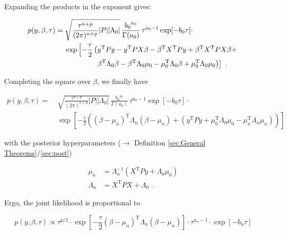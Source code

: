 \documentclass[a4paper,12pt,twoside]{book}
\begin{document}
Expanding the products in the exponent gives:

\begin{equation} \label{eq:blr-post-GLM-NG-JL-s3}
\begin{split}
p(y,\beta,\tau) = \; & \sqrt{\frac{\tau^{n+p}}{(2 \pi)^{n+p}} |P| |\Lambda_0|} \, \frac{ {b_0}^{a_0}}{\Gamma(a_0)} \, \tau^{a_0-1} \exp[-b_0 \tau] \cdot \\
& \exp\left[ -\frac{\tau}{2} \left( y^\mathrm{T} P y - y^\mathrm{T} P X \beta - \beta^\mathrm{T} X^\mathrm{T} P y + \beta^\mathrm{T} X^\mathrm{T} P X \beta + \right. \right. \\
& \hphantom{\exp \left[ -\frac{\tau}{2} \right.} \; \left. \left. \beta^\mathrm{T} \Lambda_0 \beta - \beta^\mathrm{T} \Lambda_0 \mu_0 - \mu_0^\mathrm{T} \Lambda_0 \beta + \mu_0^\mathrm{T} \Lambda_0 \mu_0 \right) \right] \; .
\end{split}
\end{equation}

Completing the square over $\beta$, we finally have

\begin{equation} \label{eq:blr-post-GLM-NG-JL-s4}
\begin{split}
p(y,\beta,\tau) = \; & \sqrt{\frac{\tau^{n+p}}{(2 \pi)^{n+p}} |P| |\Lambda_0|} \, \frac{ {b_0}^{a_0}}{\Gamma(a_0)} \, \tau^{a_0-1} \exp[-b_0 \tau] \cdot \\
& \exp\left[ -\frac{\tau}{2} \left( (\beta-\mu_n)^\mathrm{T} \Lambda_n (\beta-\mu_n) + (y^\mathrm{T} P y + \mu_0^\mathrm{T} \Lambda_0 \mu_0 - \mu_n^\mathrm{T} \Lambda_n \mu_n) \right) \right]
\end{split}
\end{equation}

with the posterior hyperparameters ($\rightarrow$ Definition \ref{sec:General Theorems}/\ref{sec:post})

\begin{equation} \label{eq:blr-post-GLM-NG-post-beta-par}
\begin{split}
\mu_n &= \Lambda_n^{-1} (X^\mathrm{T} P y + \Lambda_0 \mu_0) \\
\Lambda_n &= X^\mathrm{T} P X + \Lambda_0 \; .
\end{split}
\end{equation}

Ergo, the joint likelihood is proportional to

\begin{equation} \label{eq:blr-post-GLM-NG-JL-s5}
p(y,\beta,\tau) \propto \tau^{p/2} \cdot \exp\left[ -\frac{\tau}{2} (\beta-\mu_n)^\mathrm{T} \Lambda_n (\beta-\mu_n) \right] \cdot \tau^{a_n-1} \cdot \exp\left[ -b_n \tau \right]
\end{equation}
\end{document}
